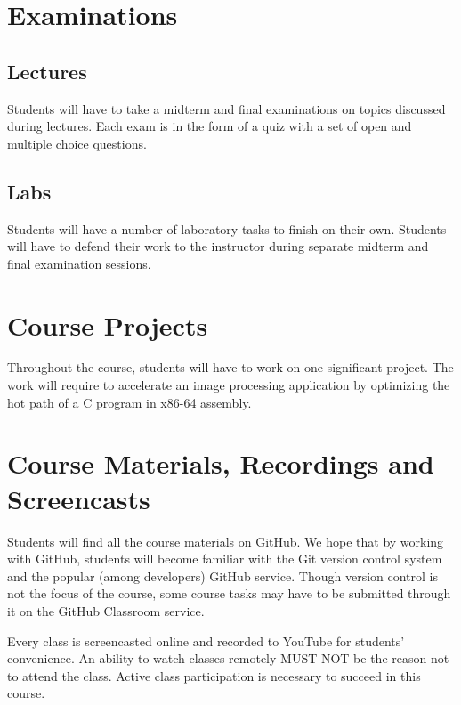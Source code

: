 \documentclass[12pt,a4paper,oneside]{article}
\begin{document}
    \section{Examinations}

        \subsection{Lectures}

            Students will have to take a midterm and final examinations on
            topics discussed during lectures. Each exam is in the form of a quiz
            with a set of open and multiple choice questions.

        \subsection{Labs}

            Students will have a number of laboratory tasks to finish on their
            own. Students will have to defend their work to the instructor
            during separate midterm and final examination sessions.

    \section{Course Projects}

        Throughout the course, students will have to work on one significant
        project. The work will require to accelerate an image processing
        application by optimizing the hot path of a C program in x86-64
        assembly.

    \section{Course Materials, Recordings and Screencasts}

        Students will find all the course materials on GitHub. We hope that by
        working with GitHub, students will become familiar with the Git version
        control system and the popular (among developers) GitHub service. Though
        version control is not the focus of the course, some course tasks may
        have to be submitted through it on the GitHub Classroom service.

        Every class is screencasted online and recorded to YouTube for students’
        convenience. An ability to watch classes remotely MUST NOT be the reason
        not to attend the class. Active class participation is necessary to
        succeed in this course.
\end{document}
